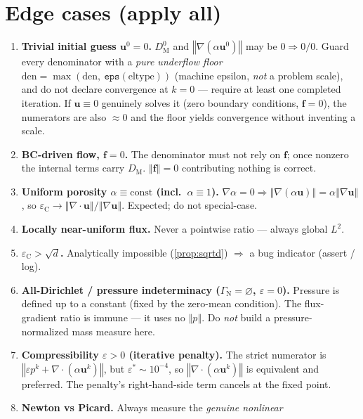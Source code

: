\documentclass[11pt]{article}
\newcommand{\bu}{\boldsymbol{u}}
\newcommand{\bef}{\boldsymbol{f}}
\newcommand{\grad}{\nabla}
\newcommand{\divg}{\nabla\!\cdot\!}
\newcommand{\norm}[1]{\left\Vert #1\right\Vert}
\newcommand{\DM}{D_{\mathrm M}}
\newcommand{\epsC}{\varepsilon_{\mathrm C}}
\theoremstyle{plain}
\theoremstyle{remark}
\begin{document}
\section{Edge cases (apply all)}\label{sec:edge}
\begin{enumerate}
  \item \textbf{Trivial initial guess $\bu^0=0$.} $\DM^0$ and
    $\norm{\grad(\alpha\bu^0)}$ may be $0\Rightarrow 0/0$. Guard every denominator
    with a \emph{pure underflow floor}
    $\text{den}=\max(\text{den},\ \texttt{eps}(\text{eltype}))$ (machine epsilon,
    \emph{not} a problem scale), and do not declare convergence at $k=0$ ---
    require at least one completed iteration. If $\bu\equiv0$ genuinely solves it
    (zero boundary conditions, $\bef=0$), the numerators are also $\approx0$ and
    the floor yields convergence without inventing a scale.
  \item \textbf{BC-driven flow, $\bef=0$.} The denominator must not rely on
    $\bef$; once nonzero the internal terms carry $\DM$. $\norm{\bef}=0$
    contributing nothing is correct.
  \item \textbf{Uniform porosity $\alpha\equiv\text{const}$ (incl.\
    $\alpha\equiv1$).} $\grad\alpha=0\Rightarrow\norm{\grad(\alpha\bu)}
    =\alpha\norm{\grad\bu}$, so $\epsC\to\norm{\divg\bu}/\norm{\grad\bu}$.
    Expected; do not special-case.
  \item \textbf{Locally near-uniform flux.} Never a pointwise ratio --- always
    global $L^2$.
  \item \textbf{$\epsC>\sqrt{d}$.} Analytically impossible
    (\cref{prop:sqrtd}) $\Rightarrow$ a bug indicator (assert / log).
  \item \textbf{All-Dirichlet / pressure indeterminacy
    ($\Gamma_{\mathrm N}=\varnothing$, $\varepsilon=0$).} Pressure is defined up
    to a constant (fixed by the zero-mean condition). The flux-gradient ratio is
    immune --- it uses no $\norm{p}$. Do \emph{not} build a pressure-normalized
    mass measure here.
  \item \textbf{Compressibility $\varepsilon>0$ (iterative penalty).} The strict
    numerator is $\norm{\varepsilon p^k+\divg(\alpha\bu^k)}$, but
    $\varepsilon^\ast\sim10^{-4}$, so $\norm{\divg(\alpha\bu^k)}$ is equivalent
    and preferred. The penalty's right-hand-side term cancels at the fixed point.
  \item \textbf{Newton vs Picard.} Always measure the \emph{genuine nonlinear
}
\end{enumerate}
\end{document}
